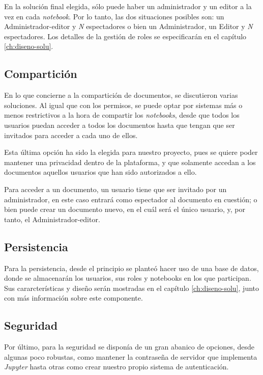 \documentclass[11pt,spanish,listoffigures]{tfgetsinf}
\begin{document}
En la solución final elegida, sólo puede haber un administrador y un editor a la vez en cada \textit{notebook}. Por lo tanto, las dos situaciones posibles son: un Administrador-editor y \textit{N} espectadores o bien un Administrador, un Editor y \textit{N} espectadores. Los detalles de la gestión de roles se especificarán en el capítulo \ref{ch:diseno-solu}.


\subsection{Compartición}
\label{subsec:comparticion}

En lo que concierne a la compartición de documentos, se discutieron varias soluciones. Al igual que con los permisos, se puede optar por sistemas más o menos restrictivos a la hora de compartir los \textit{notebooks}, desde que todos los usuarios puedan acceder a todos los documentos hasta que tengan que ser invitados para acceder a cada uno de ellos.

Esta última opción ha sido la elegida para nuestro proyecto, pues se quiere poder mantener una privacidad dentro de la plataforma, y que solamente accedan a los documentos aquellos usuarios que han sido autorizados a ello.

Para acceder a un documento, un usuario tiene que ser invitado por un administrador, en este caso entrará como espectador al documento en cuestión; o bien puede crear un documento nuevo, en el cuál será el único usuario, y, por tanto, el Administrador-editor.


\subsection{Persistencia}
\label{subsec:persistencia}

Para la persistencia, desde el principio se planteó hacer uso de una base de datos, donde se almacenarán los usuarios, sus roles y notebooks en los que participan. Sus cararcterísticas y diseño serán mostradas en el capítulo \ref{ch:diseno-solu}, junto con más información sobre este componente.


\subsection{Seguridad}
\label{subsec:seguridad}

Por último, para la seguridad se disponía de un gran abanico de opciones, desde algunas poco robustas, como mantener la contraseña de servidor que implementa \textit{Jupyter} hasta otras como crear nuestro propio sistema de autenticación.
\end{document}
